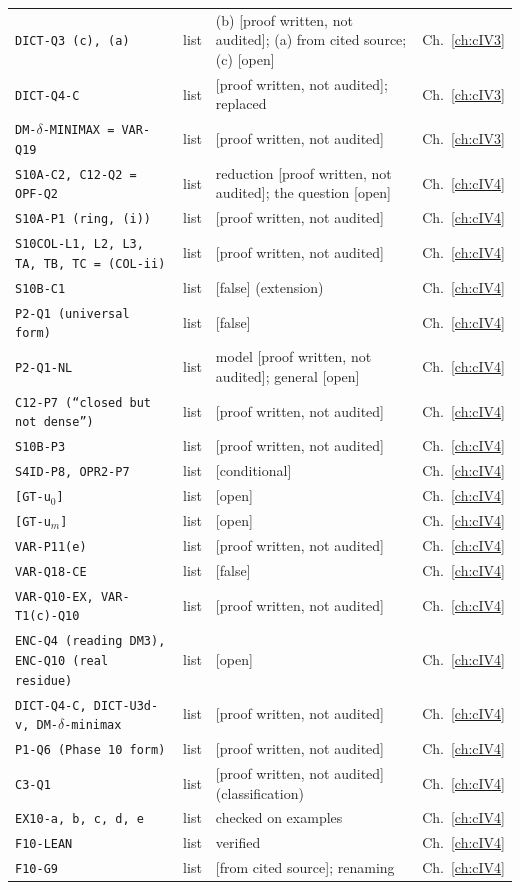 \documentclass[11pt,a4paper,oneside]{report}
\newcommand{\badge}[2]{\textcolor{#1}{\textsf{\footnotesize[#2]}}}
\newcommand{\pw}{\badge{cD}{proof written, not audited}}
\newcommand{\cf}{\badge{cD}{from cited source}}
\newcommand{\condl}{\badge{cD}{conditional}}
\newcommand{\openq}{\badge{cB}{open}}
\newcommand{\falsest}{\badge{cB}{false}}
\begin{document}
\begin{center}
\begin{longtable}{@{}L{5.4cm}L{1.0cm}L{5.6cm}L{1.4cm}@{}}
\texttt{DICT-Q3 (c), (a)} & list & (b) \pw; (a) from cited source; (c) \openq & Ch.~\ref{ch:cIV3}\\
\texttt{DICT-Q4-C} & list & \pw; replaced & Ch.~\ref{ch:cIV3}\\
\texttt{DM-$\delta$-MINIMAX = VAR-Q19} & list & \pw & Ch.~\ref{ch:cIV3}\\
\texttt{S10A-C2, C12-Q2 = OPF-Q2} & list & reduction \pw; the question \openq & Ch.~\ref{ch:cIV4}\\
\texttt{S10A-P1 (ring, (i))} & list & \pw & Ch.~\ref{ch:cIV4}\\
\texttt{S10COL-L1, L2, L3, TA, TB, TC = (COL-ii)} & list & \pw & Ch.~\ref{ch:cIV4}\\
\texttt{S10B-C1} & list & \falsest{} (extension) & Ch.~\ref{ch:cIV4}\\
\texttt{P2-Q1 (universal form)} & list & \falsest & Ch.~\ref{ch:cIV4}\\
\texttt{P2-Q1-NL} & list & model \pw; general \openq & Ch.~\ref{ch:cIV4}\\
\texttt{C12-P7 (``closed but not dense'')} & list & \pw & Ch.~\ref{ch:cIV4}\\
\texttt{S10B-P3} & list & \pw & Ch.~\ref{ch:cIV4}\\
\texttt{S4ID-P8, OPR2-P7} & list & \condl & Ch.~\ref{ch:cIV4}\\
\texttt{[GT-u$_0$]} & list & \openq & Ch.~\ref{ch:cIV4}\\
\texttt{[GT-u$_m$]} & list & \openq & Ch.~\ref{ch:cIV4}\\
\texttt{VAR-P11(e)} & list & \pw & Ch.~\ref{ch:cIV4}\\
\texttt{VAR-Q18-CE} & list & \falsest & Ch.~\ref{ch:cIV4}\\
\texttt{VAR-Q10-EX, VAR-T1(c)-Q10} & list & \pw & Ch.~\ref{ch:cIV4}\\
\texttt{ENC-Q4 (reading DM3), ENC-Q10 (real residue)} & list & \openq & Ch.~\ref{ch:cIV4}\\
\texttt{DICT-Q4-C, DICT-U3d-v, DM-$\delta$-minimax} & list & \pw & Ch.~\ref{ch:cIV4}\\
\texttt{P1-Q6 (Phase 10 form)} & list & \pw & Ch.~\ref{ch:cIV4}\\
\texttt{C3-Q1} & list & \pw (classification) & Ch.~\ref{ch:cIV4}\\
\texttt{EX10-a, b, c, d, e} & list & checked on examples & Ch.~\ref{ch:cIV4}\\
\texttt{F10-LEAN} & list & verified & Ch.~\ref{ch:cIV4}\\
\texttt{F10-G9} & list & \cf; renaming & Ch.~\ref{ch:cIV4}\\
\bottomrule
\end{longtable}
\end{center}
\end{document}
